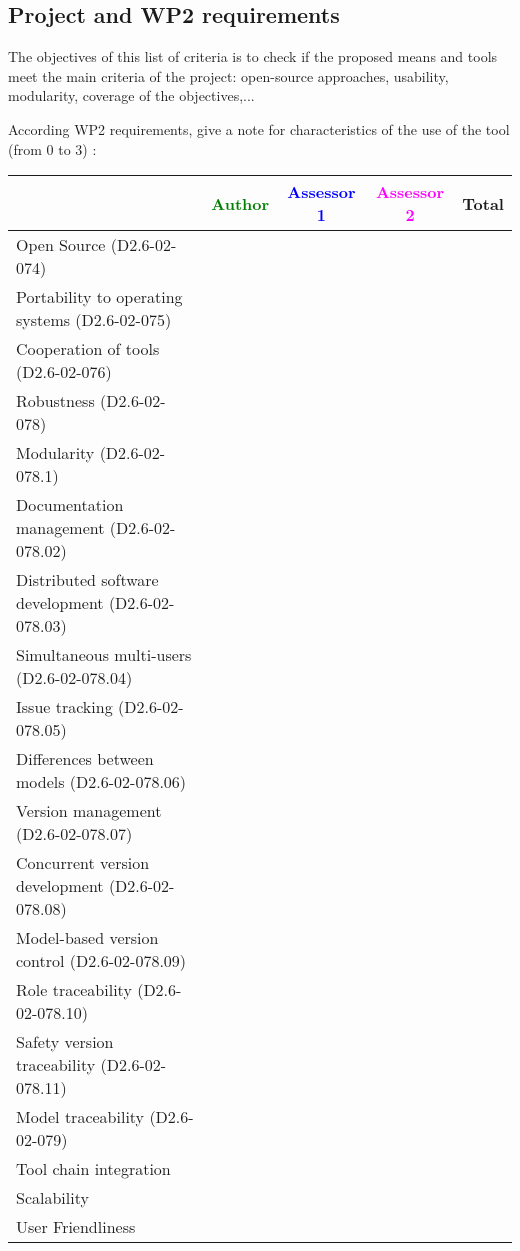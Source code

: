 \subsection{Project and WP2 requirements}

The objectives of this list of criteria is to check if the proposed means and tools meet the main criteria of the project: open-source approaches, usability, modularity, coverage of the objectives,...

According WP2 requirements, give a note for characteristics of the use of the tool (from 0 to 3) :

\begin{tabular}{|l | c | c | c | c|}
\hline
& \textcolor{green}{Author} & \textcolor{blue}{Assessor 1} & \textcolor{magenta}{Assessor 2} & Total \\
\hline 
Open Source (D2.6-02-074) & & & &  \\
\hline 
Portability to operating systems (D2.6-02-075) & & & &  \\
\hline
Cooperation of tools (D2.6-02-076) & & & &  \\
\hline
Robustness (D2.6-02-078) & & & & \\
\hline
Modularity (D2.6-02-078.1) & & & & \\
\hline
Documentation management (D2.6-02-078.02) & & & & \\
\hline
Distributed software development (D2.6-02-078.03)  & & & & \\
\hline
Simultaneous multi-users (D2.6-02-078.04)   & & & & \\
\hline
Issue tracking (D2.6-02-078.05) & & & & \\
\hline
Differences between models (D2.6-02-078.06) & & & & \\
\hline
Version management (D2.6-02-078.07) & & & & \\
\hline
Concurrent version development (D2.6-02-078.08) & & & & \\
\hline
Model-based version control (D2.6-02-078.09) & & & & \\
\hline
Role traceability (D2.6-02-078.10) & & & & \\
\hline
Safety version traceability (D2.6-02-078.11) & & & & \\
\hline
Model traceability (D2.6-02-079) & & & & \\
\hline
Tool chain integration & & & & \\
\hline
Scalability & & & & \\
\hline
User Friendliness & & & & \\
\hline
\end{tabular}




